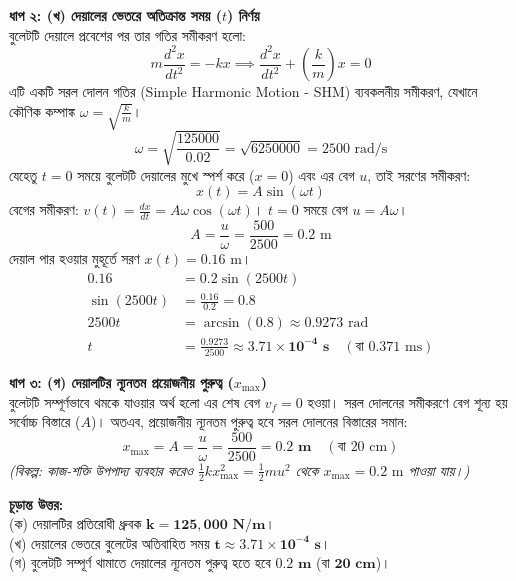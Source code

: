 \documentclass[12pt, a4paper]{article}
\begin{document}
\begin{tcolorbox}[solutionbox={সমাধান (Solution)}]
\vspace{0.5em}
\noindent
\textbf{ধাপ ২: (খ) দেয়ালের ভেতরে অতিক্রান্ত সময় ($t$) নির্ণয়} \\
বুলেটটি দেয়ালে প্রবেশের পর তার গতির সমীকরণ হলো:
\[ m \frac{d^2 x}{dt^2} = -k x \implies \frac{d^2 x}{dt^2} + \left(\frac{k}{m}\right) x = 0 \]
এটি একটি সরল দোলন গতির (Simple Harmonic Motion - SHM) ব্যবকলনীয় সমীকরণ, যেখানে কৌণিক কম্পাঙ্ক $\omega = \sqrt{\frac{k}{m}}$।
\[ \omega = \sqrt{\frac{125000}{0.02}} = \sqrt{6250000} = 2500 \text{ rad/s} \]
যেহেতু $t = 0$ সময়ে বুলেটটি দেয়ালের মুখে স্পর্শ করে ($x = 0$) এবং এর বেগ $u$, তাই সরণের সমীকরণ:
\[ x(t) = A \sin(\omega t) \]
বেগের সমীকরণ: $v(t) = \frac{dx}{dt} = A \omega \cos(\omega t)$। $t = 0$ সময়ে বেগ $u = A \omega$।
\[ A = \frac{u}{\omega} = \frac{500}{2500} = 0.2 \text{ m} \]
দেয়াল পার হওয়ার মুহূর্তে সরণ $x(t) = 0.16 \text{ m}$।
\begin{align*}
    0.16 &= 0.2 \sin(2500 t) \\
    \sin(2500 t) &= \frac{0.16}{0.2} = 0.8 \\
    2500 t &= \arcsin(0.8) \approx 0.9273 \text{ rad} \\
    t &= \frac{0.9273}{2500} \approx \mathbf{3.71 \times 10^{-4} \text{ s}} \quad (\text{বা } 0.371 \text{ ms})
\end{align*}

\vspace{0.5em}
\noindent
\textbf{ধাপ ৩: (গ) দেয়ালটির ন্যূনতম প্রয়োজনীয় পুরুত্ব ($x_{\text{max}}$)} \\
বুলেটটি সম্পূর্ণভাবে থমকে যাওয়ার অর্থ হলো এর শেষ বেগ $v_f = 0$ হওয়া। সরল দোলনের সমীকরণে বেগ শূন্য হয় সর্বোচ্চ বিস্তারে ($A$)। 
অতএব, প্রয়োজনীয় ন্যূনতম পুরুত্ব হবে সরল দোলনের বিস্তারের সমান:
\[ x_{\text{max}} = A = \frac{u}{\omega} = \frac{500}{2500} = \mathbf{0.2 \text{ m}} \quad (\text{বা } 20 \text{ cm}) \]
\textit{(বিকল্প: কাজ-শক্তি উপপাদ্য ব্যবহার করেও $\frac{1}{2} k x_{\text{max}}^2 = \frac{1}{2} m u^2$ থেকে $x_{\text{max}} = 0.2 \text{ m}$ পাওয়া যায়।)}

\vspace{1em}
\begin{tcolorbox}[answerbox]
\textbf{চূড়ান্ত উত্তর:} \\
(ক) দেয়ালটির প্রতিরোধী ধ্রুবক $\mathbf{k = 125,000 \text{ N/m}}$। \\
(খ) দেয়ালের ভেতরে বুলেটের অতিবাহিত সময় $\mathbf{t \approx 3.71 \times 10^{-4} \text{ s}}$। \\
(গ) বুলেটটি সম্পূর্ণ থামাতে দেয়ালের ন্যূনতম পুরুত্ব হতে হবে $\mathbf{0.2 \text{ m}}$ (বা $\mathbf{20 \text{ cm}}$)।
\end{tcolorbox}
\end{tcolorbox}
\end{document}
